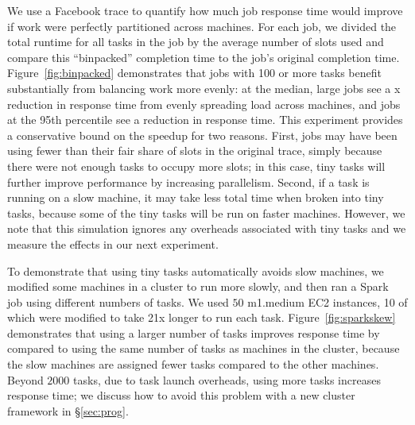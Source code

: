 We use a Facebook trace to quantify how much job response time would
improve if work were perfectly partitioned across machines.
For each job, we divided the total runtime for all tasks in the
job by the average number of slots used and compare this ``binpacked''
completion time to the job's original completion time.
Figure~\ref{fig:binpacked}
demonstrates that jobs with 100 or more tasks benefit substantially from
balancing work more evenly: at the median, large jobs see
a x reduction in response time from evenly spreading load
across machines, and
jobs at the 95th percentile see a  reduction in response time.
This experiment provides a conservative bound on the speedup for two reasons. First, jobs
may have been using fewer than their fair share of slots in the original trace,
simply because there were not enough tasks to occupy more slots; in this case,
tiny tasks will further improve performance by increasing parallelism. Second,
if a task is running on a slow machine, it may take less total time when
broken into tiny tasks, because some of the tiny tasks will be run on faster
machines. However, we note that this simulation ignores any overheads associated with 
tiny tasks and we measure the effects in our next experiment.



To demonstrate that using tiny tasks automatically avoids slow machines,
we modified some machines in a cluster to run more slowly, and then
ran a Spark~\cite{zaharia2010spark} job using different numbers of tasks. 
We used $50$ m1.medium EC2
instances, 10 of which were modified to take 21x longer to run each task.
Figure~\ref{fig:sparkskew} demonstrates that using a larger number of tasks
improves response time by  compared to using the same number
of tasks as machines in the cluster, because the slow machines are
assigned fewer tasks
compared to the other machines. Beyond $2000$ tasks, due to
task launch overheads, using more tasks increases response time; we discuss
how to avoid this problem with a new cluster framework in \S\ref{sec:prog}.


